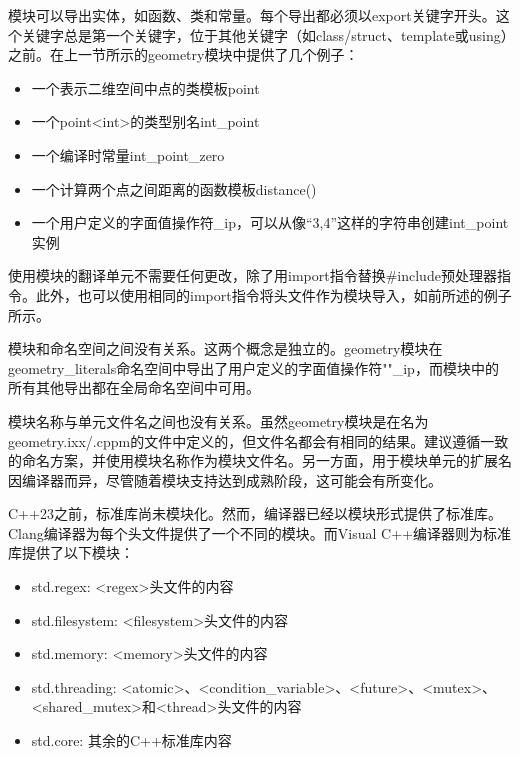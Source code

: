 
模块可以导出实体，如函数、类和常量。每个导出都必须以export关键字开头。这个关键字总是第一个关键字，位于其他关键字（如class/struct、template或using）之前。在上一节所示的geometry模块中提供了几个例子：

\begin{itemize}
\item
一个表示二维空间中点的类模板point

\item
一个point<int>的类型别名int\_point

\item
一个编译时常量int\_point\_zero

\item
一个计算两个点之间距离的函数模板distance()

\item
一个用户定义的字面值操作符\_ip，可以从像“3,4”这样的字符串创建int\_point实例
\end{itemize}

使用模块的翻译单元不需要任何更改，除了用import指令替换\#include预处理器指令。此外，也可以使用相同的import指令将头文件作为模块导入，如前所述的例子所示。

模块和命名空间之间没有关系。这两个概念是独立的。geometry模块在geometry\_literals命名空间中导出了用户定义的字面值操作符""\_ip，而模块中的所有其他导出都在全局命名空间中可用。

模块名称与单元文件名之间也没有关系。虽然geometry模块是在名为geometry.ixx/.cppm的文件中定义的，但文件名都会有相同的结果。建议遵循一致的命名方案，并使用模块名称作为模块文件名。另一方面，用于模块单元的扩展名因编译器而异，尽管随着模块支持达到成熟阶段，这可能会有所变化。

C++23之前，标准库尚未模块化。然而，编译器已经以模块形式提供了标准库。Clang编译器为每个头文件提供了一个不同的模块。而Visual C++编译器则为标准库提供了以下模块：

\begin{itemize}
\item
std.regex: <regex>头文件的内容

\item
std.filesystem: <filesystem>头文件的内容

\item
std.memory: <memory>头文件的内容

\item
std.threading: <atomic>、<condition\_variable>、<future>、<mutex>、<shared\_mutex>和<thread>头文件的内容

\item
std.core: 其余的C++标准库内容
\end{itemize}

